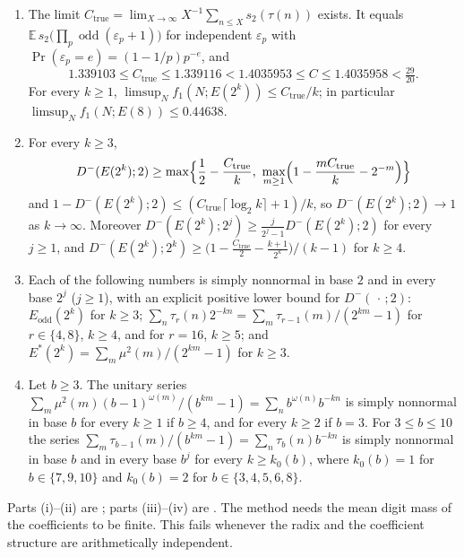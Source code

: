 \documentclass[11pt]{article}
\DeclareMathOperator{\odd}{odd}
\newcommand{\Ctrue}{C_{\mathrm{true}}}
\newcommand{\Ex}{\mathbb E}
\begin{document}
\begin{maintheorem}\label{thm:sharp}
\begin{enumerate}[label=\textup{(\roman*)},nosep]
\item {} The limit $\Ctrue=\lim_{X\to\infty}X^{-1}\sum_{n\le X}s_2(\tau(n))$ exists. It equals $\Ex\,s_2\bigl(\prod_p\odd(\varepsilon_p+1)\bigr)$ for independent $\varepsilon_p$ with $\Pr(\varepsilon_p=e)=(1-1/p)p^{-e}$, and
\[
1.339103\le\Ctrue\le1.339116<1.4035953\le C\le1.4035958<\tfrac{29}{20}.
\]
For every $k\ge1$, $\limsup_Nf_1(N;E(2^k))\le\Ctrue/k$; in particular $\limsup_Nf_1(N;E(8))\le0.44638$.
\item {} For every $k\ge3$,
\[
D^-(E(2^k);2)\ge\max\Bigl\{\frac12-\frac{\Ctrue}k,\ \max_{m\ge1}\Bigl(1-\frac{m\Ctrue}k-2^{-m}\Bigr)\Bigr\}
\]
and $1-D^-(E(2^k);2)\le(\Ctrue\lceil\log_2k\rceil+1)/k$, so $D^-(E(2^k);2)\to1$ as $k\to\infty$. Moreover $D^-(E(2^k);2^j)\ge\frac{j}{2^j-1}D^-(E(2^k);2)$ for every $j\ge1$, and $D^-(E(2^k);2^k)\ge\bigl(1-\frac{\Ctrue}2-\frac{k+1}{2^k}\bigr)/(k-1)$ for $k\ge4$.
\item {} Each of the following numbers is simply nonnormal in base $2$ and in every base $2^j$ ($j\ge1$), with an explicit positive lower bound for $D^-(\,\cdot\,;2)$: $E_{\mathrm{odd}}(2^k)$ for $k\ge3$; $\sum_{n}\tau_r(n)2^{-kn}=\sum_m\tau_{r-1}(m)/(2^{km}-1)$ for $r\in\{4,8\}$, $k\ge4$, and for $r=16$, $k\ge5$; and $E^*(2^k)=\sum_m\mu^2(m)/(2^{km}-1)$ for $k\ge3$.
\item {} Let $b\ge3$. The unitary series $\sum_m\mu^2(m)(b-1)^{\omega(m)}/(b^{km}-1)=\sum_nb^{\omega(n)}b^{-kn}$ is simply nonnormal in base $b$ for every $k\ge1$ if $b\ge4$, and for every $k\ge2$ if $b=3$. For $3\le b\le10$ the series $\sum_m\tau_{b-1}(m)/(b^{km}-1)=\sum_n\tau_b(n)b^{-kn}$ is simply nonnormal in base $b$ and in every base $b^j$ for every $k\ge k_0(b)$, where $k_0(b)=1$ for $b\in\{7,9,10\}$ and $k_0(b)=2$ for $b\in\{3,4,5,6,8\}$.
\end{enumerate}
\end{maintheorem}

Parts (i)--(ii) are ; parts (iii)--(iv) are . The method needs the mean digit mass of the coefficients to be finite. This fails whenever the radix and the coefficient structure are arithmetically independent.
\end{document}
